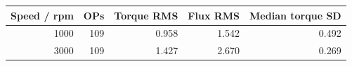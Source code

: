 \begin{tabular}{rrrrr}
\toprule
Speed / rpm & OPs & Torque RMS & Flux RMS & Median torque SD\\
\midrule
1000 & 109 & 0.958 & 1.542 & 0.492 \\
3000 & 109 & 1.427 & 2.670 & 0.269 \\
\bottomrule
\end{tabular}

